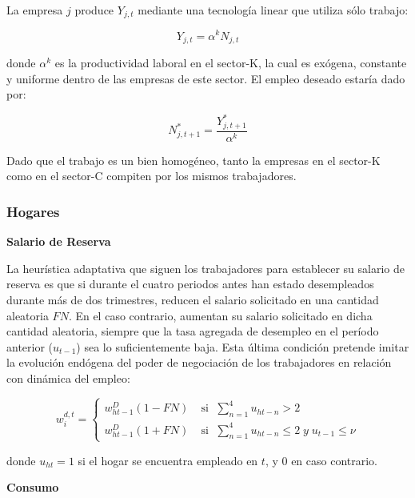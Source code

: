 \documentclass[12pt,a4paper]{article}
\begin{document}
La empresa $j$ produce $Y_{j,t}$ mediante una tecnología linear que utiliza sólo trabajo:

\begin{equation}
Y_{j,t}= \alpha^k N_{j,t}
\end{equation}

donde $\alpha^k$ es la productividad laboral en el sector-K, la cual es exógena, constante y uniforme dentro de las empresas de este sector. El empleo deseado estaría dado por:

\begin{equation}
N_{j,t+1}^*=\dfrac{Y_{j,t+1}^*}{\alpha^k}
\end{equation}

Dado que el trabajo es un bien homogéneo, tanto la empresas en el sector-K como en el sector-C compiten por los mismos trabajadores. 

\subsubsection{Hogares}

\vspace{.2cm}
\textbf{Salario de Reserva}
\vspace{.2cm}
 
La heurística adaptativa que siguen los trabajadores  para establecer su salario de reserva es que si durante el cuatro periodos antes han estado desempleados durante más de dos trimestres, reducen el salario solicitado en una cantidad aleatoria $FN$. En el caso contrario, aumentan su salario solicitado en dicha cantidad aleatoria, siempre que la tasa agregada de desempleo en el período anterior ($u_{t-1}$) sea lo suficientemente baja. Esta última condición pretende imitar la evolución endógena del poder de negociación de los trabajadores en relación con dinámica del empleo:

\begin{equation}
w_{i}^{d,t} =
\begin{cases}
       w_{ht-1}^D(1-FN)   & \; \text{si $\; \sum_{n=1}^4 u_{ht-n} > 2$} \\
       w_{ht-1}^D(1+FN) & \; \text{si $\; \sum_{n=1}^4 u_{ht-n} \leq 2 \; y \; u_{t-1} \leq \nu $} 

\end{cases}
\end{equation}

donde $u_{ht}=1$ si el hogar se encuentra empleado en $t$, y 0 en caso contrario.

\vspace{.2cm}
\textbf{Consumo}
\vspace{.2cm}
 
\end{document}
